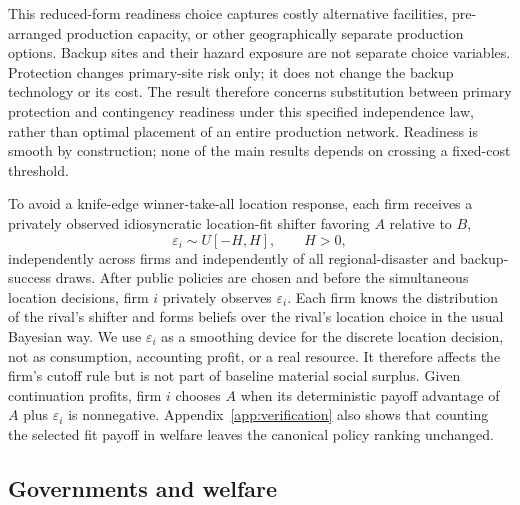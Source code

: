 This reduced-form readiness choice captures costly alternative facilities, pre-arranged production capacity, or other geographically separate production options. Backup sites and their hazard exposure are not separate choice variables. Protection changes primary-site risk only; it does not change the backup technology or its cost. The result therefore concerns substitution between primary protection and contingency readiness under this specified independence law, rather than optimal placement of an entire production network. Readiness is smooth by construction; none of the main results depends on crossing a fixed-cost threshold.

To avoid a knife-edge winner-take-all location response, each firm receives a privately observed idiosyncratic location-fit shifter favoring $A$ relative to $B$,
\begin{equation}
\varepsilon_i\sim U[-H,H],\qquad H>0,
\label{eq:location-shock}
\end{equation}
independently across firms and independently of all regional-disaster and backup-success draws. After public policies are chosen and before the simultaneous location decisions, firm $i$ privately observes $\varepsilon_i$. Each firm knows the distribution of the rival's shifter and forms beliefs over the rival's location choice in the usual Bayesian way. We use $\varepsilon_i$ as a smoothing device for the discrete location decision, not as consumption, accounting profit, or a real resource. It therefore affects the firm's cutoff rule but is not part of baseline material social surplus. Given continuation profits, firm $i$ chooses $A$ when its deterministic payoff advantage of $A$ plus $\varepsilon_i$ is nonnegative. Appendix~\ref{app:verification} also shows that counting the selected fit payoff in welfare leaves the canonical policy ranking unchanged.

\subsection{Governments and welfare}

